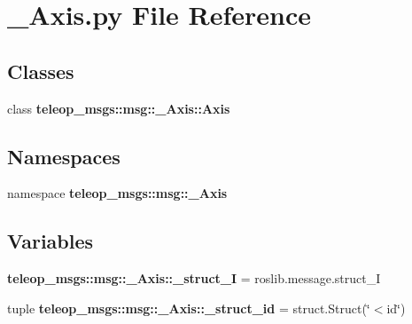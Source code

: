 \section{\_\-Axis.py File Reference}
\label{__Axis_8py}
\subsection*{Classes}
\begin{DoxyCompactItemize}
\item 
class {\bf teleop\_\-msgs::msg::\_\-Axis::Axis}
\end{DoxyCompactItemize}
\subsection*{Namespaces}
\begin{DoxyCompactItemize}
\item 
namespace {\bf teleop\_\-msgs::msg::\_\-Axis}
\end{DoxyCompactItemize}
\subsection*{Variables}
\begin{DoxyCompactItemize}
\item 
{\bf teleop\_\-msgs::msg::\_\-Axis::\_\-struct\_\-I} = roslib.message.struct\_\-I
\item 
tuple {\bf teleop\_\-msgs::msg::\_\-Axis::\_\-struct\_\-id} = struct.Struct(\char`\"{}$<$id\char`\"{})
\end{DoxyCompactItemize}
